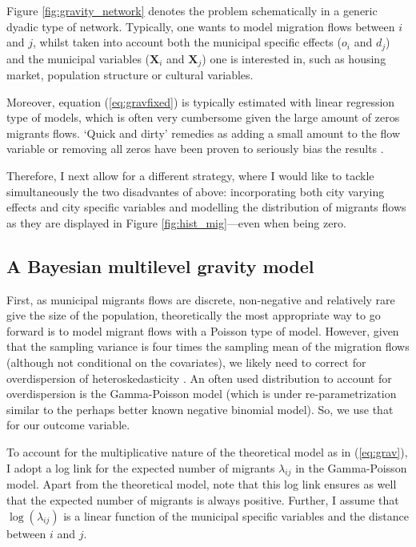 \documentclass[fleqn,10pt]{SelfArx} %
\begin{document}
        Figure \ref{fig:gravity_network} denotes the problem schematically in a generic dyadic type of network. Typically, one wants to model migration flows between $i$ and $j$, whilst taken into account both the municipal specific effects ($o_i$ and $d_j$) and the municipal variables ($\mathbf{X}_i$ and $\mathbf{X}_j$) one is interested  in, such as housing market, population structure or cultural variables. 
                  
        Moreover, equation
        (\ref{eq:gravfixed}) is typically estimated with linear regression
        type of models, which is often very cumbersome given the large
        amount of zeros migrants flows. `Quick and dirty' remedies as adding a small amount to the flow variable or removing all zeros have been proven to seriously bias the results \citep{linders2006estimation, burger2009specification}.
        	

        Therefore, I next allow for a different strategy, where I
        would like to tackle simultaneously the two disadvantes of above:
        incorporating both city varying effects and city specific variables and
        modelling the distribution of migrants flows as they are
        displayed in Figure \ref{fig:hist_mig}---even when being zero.

        \subsection{A Bayesian multilevel gravity model}

        First, as municipal migrants flows are discrete, non-negative and
        relatively rare give the size of the population, theoretically the most
        appropriate way to go forward is to model migrant flows
        with a Poisson type of model. However, given that the sampling
        variance is four times the sampling mean of the migration
        flows (although not conditional on the covariates), we likely
        need to correct for overdispersion of heteroskedasticity
        \citep[][states that heteroskedasticity (rather than the
        presence of too many zeros) is responsible for the main
        source of bias within gravity models.]{silva2006log}. An often used distribution to
        account for overdispersion is the Gamma-Poisson model (which is under re-parametrization
        similar to the perhaps better known negative binomial model). So, we use that for our
        outcome variable.

        To account for the multiplicative nature of the theoretical
        model as in (\ref{eq:grav}), I adopt a log link for the
        expected number of migrants $\lambda_{ij}$ in the Gamma-Poisson model. 
        Apart from the theoretical model, note that this log link ensures 
        as well that the expected number of migrants is always positive. 
        Further, I assume that $\log(\lambda_{ij})$ is a linear function 
        of the municipal specific variables and the distance between $i$ and $j$.
\end{document}
